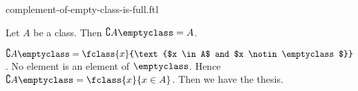 \documentclass{article}
\begin{document}
\begin{smodule}[creators={Marcel Schütz}]{complement-of-empty-class-is-full.ftl}

  \begin{fproposition*}[label=771302931562496]
    Let $A$ be a class.
    Then $\complement{A}{\emptyclass} = A$.
  \end{fproposition*}
  \begin{fproof}
    $\complement{A}{\emptyclass} = \fclass{x}{\text{$x \in A$ and $x \notin \emptyclass$}}$.
    No element is an element of $\emptyclass$.
    Hence $\complement{A}{\emptyclass} = \fclass{x}{x \in A}$.
    Then we have the thesis.
  \end{fproof}
\end{smodule}
\end{document}
